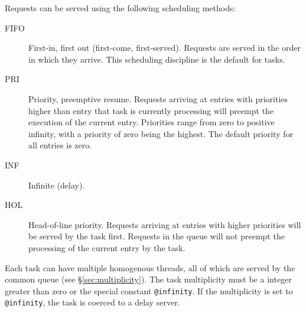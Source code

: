 Requests can be served using the following scheduling
methods:
\begin{description}
\item[FIFO] First-in, first out (first-come,
  first-served).  Requests are served in the order in which they
  arrive.  This scheduling discipline is the default for tasks.
\item[PRI] Priority, preemptive resume.  Requests
  arriving at entries with priorities higher than entry that
  task is currently processing will preempt the execution of the current entry.
  Priorities range from zero to positive infinity, with a priority of zero being the
  highest.  The default priority for all entries is zero.
\item[INF] Infinite (delay). 
\item[HOL] Head-of-line priority.
  Requests arriving at entries with higher priorities will be served
  by the task first.  Requests in the queue will not preempt the
  processing of the current entry by the task.
\end{description}

Each task can have multiple homogenous
threads, all of which are served by
the common queue (see \S\protect\ref{sec:multiplicity}).  The task
multiplicity must be a integer greater than zero or the
special constant
\texttt{@infinity}.  If
the multiplicity is set to \texttt{@infinity}, the task is coerced to a delay server.

